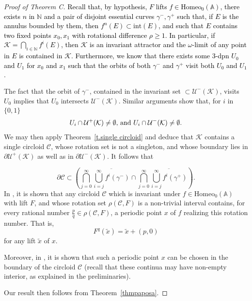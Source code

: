 \documentclass[12pt,a4paper]{amsart}
\theoremstyle{definition}
\theoremstyle{remark}
\newcommand{\N}{\mathbb{N}}
\newcommand{\homeo}{\mathrm{Homeo}_0(\A)}
\newcommand{\A}{\mathbb{A}}
\begin{document}
\begin{proof}[Proof of Theorem C]\textcolor{black}{Recall that, by hypothesis, $F$ lifts $f\in\homeo$, there exists $n$ in $\N$ and a  pair of disjoint essential curves \( \gamma^-, \gamma^+ \) such that, if $E$ is the annulus bounded by them, then  \( f^n(E) \subset \mathrm{int}(E) \), and such that $E$ contains two fixed points \( x_0, x_1 \) with rotational difference \( \rho \geq 1 \). In particular, if $\mathcal{K}=\bigcap_{i\in\N}f^{i}(E)$, then $\mathcal{K}$ is an invariant attractor and the $\omega$-limit of any point in $E$ is contained in $\mathcal{K}$. Furthermore, we know that there exists some $3$-dpn \( U_0 \) and \( U_1 \) for \( x_0 \) and \( x_1 \) such that the orbits of both \( \gamma^- \) and \( \gamma^+ \) visit both \( U_0 \) and \( U_1 \).} 

The fact that the orbit of $\gamma^{-}$, contained in the invariant set $\subset\mathcal{U}^{-}(\mathcal{K})$, visits $U_0$ implies that $U_0$ intersects $\mathcal{U}^{-}(\mathcal{K})$. Similar arguments show that, for $i$ in $\{0,1\}$ 
$$U_i\cap \mathcal{U}^{+}(\mathcal{K})\not=\emptyset,\, \hbox{and }U_i\cap \mathcal{U}^{-}(\mathcal{K})\not=\emptyset.$$ We may then apply Theorem~\ref{t.single circloid} and deduce that $\mathcal{K}$ contains a single circloid $\mathcal{C}$, whose rotation set is not a singleton, and whose boundary lies in $\partial \mathcal{U}^{+}(\mathcal{K})$ as well as in $\partial \mathcal{U}^{-}(\mathcal{K})$. It follows that 

$$\partial \mathcal{C}\subset \left(\bigcap_{j=0}^{\infty}\overline{\bigcup_{i=j}^{\infty}f^{i}(\gamma^{-})}\cap \bigcap_{j=0}^{\infty}\overline{\bigcup_{i=j}^{\infty}f^{i}(\gamma^{+})}\right).$$
In \cite{koropeki}, it is shown that any circloid $\mathcal{C}$ which is invariant under $f \in \homeo$ with lift $F$, and whose rotation set $\rho(\mathcal{C},F)$ is a non-trivial interval contains, for every rational number $\frac{p}{q} \in \rho(\mathcal{C},F)$, a periodic point $x$ of $f$ realizing this rotation number. That is,
\[
F^q(\tilde{x}) = \tilde{x} + (p,0)
\]
for any lift $\tilde{x}$ of $x$.

Moreover, in \cite{koropass}, it is shown that such a periodic point $x$ can be chosen in the boundary of the circloid $\mathcal{C}$ (recall that these continua may have non-empty interior, as explained in the preliminaries). 

Our result then follows from Theorem~\ref{thmpaposa}.
\end{proof}
\end{document}
